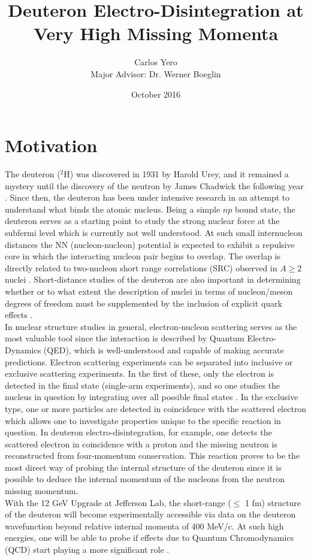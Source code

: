 \documentclass[8pt, twocolumn]{article}
\begin{document}
\title{Deuteron Electro-Disintegration at Very High Missing Momenta}
\author{Carlos Yero \\Major Advisor: Dr. Werner Boeglin}
\date{October 2016}
\maketitle

\section{Motivation} 
The deuteron ($^{2}$H) was discovered in 1931 by Harold Urey, and
it remained a mystery until the discovery of the neutron by 
James Chadwick the following year \cite{boeglin1}. Since then, the deuteron 
has been under intensive research in an attempt to understand 
what binds the atomic nucleus. Being a simple $np$ bound 
state, the deuteron serves as a starting point to study the
strong nuclear force at the subfermi level which is currently
not well understood. At such small internucleon distances 
the NN (nucleon-nucleon) potential is expected to exhibit a repulsive core in which 
the interacting nucleon pair begins to overlap. The overlap is 
directly related to two-nucleon short range correlations (SRC) observed in $A\geq2$
nuclei \cite{boeglin3}. Short-distance studies of the deuteron are
also important in determining whether or to what extent the
description of nuclei in terms of nucleon/meson degrees of 
freedom must be supplemented by the inclusion of explicit
quark effects \cite{boeglin4}. \\   
\indent In nuclear structure studies in general, electron-nucleon scattering serves as the most valuable 
tool since the interaction is described by Quantum Electro-Dynamics (QED), which is 
well-understood and capable of making accurate predictions. Electron scattering experiments can 
be separated into inclusive or exclusive scattering experiments. In the first of these, only the electron is 
detected in the final state (single-arm experiments), and so one studies the nucleus in question by
integrating over all possible final states \cite{boeglin2}. In the exclusive type, one or more 
particles are detected in coincidence with the scattered electron which allows one to investigate 
properties unique to the specific reaction in question. In deuteron electro-disintegration, for example,
one detects the scattered electron in coincidence with a proton and the missing neutron is 
reconstructed from four-momentum conservation. This reaction proves to be the most direct way of probing the 
internal structure of the deuteron since it is possible to deduce the internal momentum of the nucleons
from the neutron missing momentum. \\ 
\indent With the 12 GeV Upgrade at Jefferson Lab, the short-range ($\leq$ 1 fm) structure of the deuteron will become experimentally 
accessible via data on the deuteron wavefunction beyond relative internal momenta of 400 MeV/c.
At such high energies, one will be able to probe if effects due to 
Quantum Chromodynamics (QCD) start playing a more significant role \cite{boeglin3}. 
\end{document}
